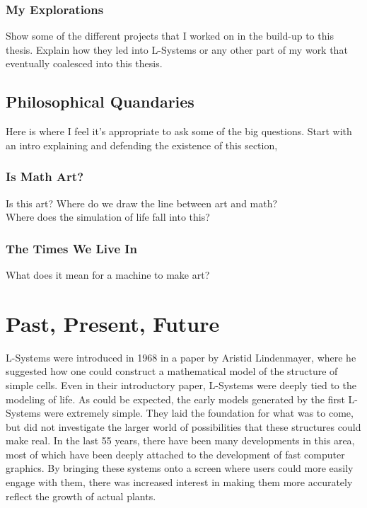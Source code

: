 \documentclass[12pt,twoside]{reedthesis}
\begin{document}
\subsection{My Explorations}
Show some of the different projects that I worked on in the build-up to this thesis. Explain how they led into L-Systems or any other part of my work that eventually coalesced into this thesis.\\

\section{Philosophical Quandaries}
Here is where I feel it's appropriate to ask some of the big questions. Start with an intro explaining and defending the existence of this section,\\
\subsection{Is Math Art?}
Is this art? Where do we draw the line between art and math?\\
Where does the simulation of life fall into this?
\subsection{The Times We Live In}
What does it mean for a machine to make art?\\



\chapter{Past, Present, Future}

	L-Systems were introduced in 1968 in a paper by Aristid Lindenmayer, where he suggested how one could construct a mathematical model of the structure of simple cells. Even in their introductory paper, L-Systems were deeply tied to the modeling of life. As could be expected, the early models generated by the first L-Systems were extremely simple. They laid the foundation for what was to come, but did not investigate the larger world of possibilities that these structures could make real. In the last 55 years, there have been many developments in this area, most of which have been deeply attached to the development of fast computer graphics. By bringing these systems onto a screen where users could more easily engage with them, there was increased interest in making them more accurately reflect the growth of actual plants.\\
	
\end{document}
